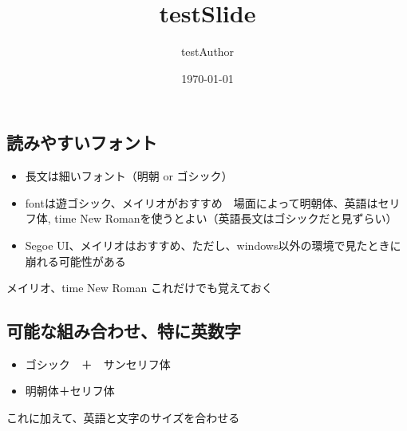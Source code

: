 \documentclass{beamer}
\title{testSlide}
\author{testAuthor}
\date{\today}
\begin{document}
\begin{frame}
    \titlepage
\end{frame}


\begin{frame}
    \section{読みやすいフォント}
    \begin{itemize}
        \item 長文は細いフォント（明朝 or ゴシック）
        \item fontは遊ゴシック、メイリオがおすすめ　場面によって明朝体、英語はセリフ体, time New Romanを使うとよい（英語長文はゴシックだと見ずらい）
        \item Segoe UI、メイリオはおすすめ、ただし、windows以外の環境で見たときに崩れる可能性がある
    \end{itemize}

    メイリオ、time New Roman これだけでも覚えておく

\end{frame}

\begin{frame}
    \section{可能な組み合わせ、特に英数字}
    \begin{itemize}
        \item ゴシック　＋　サンセリフ体
        \item 明朝体＋セリフ体
    \end{itemize}
    これに加えて、英語と文字のサイズを合わせる
\end{frame}
\end{document}
